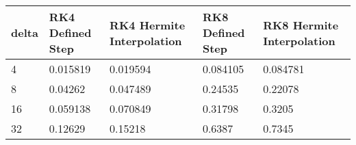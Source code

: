 \begin{tabular}{lllll}
delta & RK4 Defined Step & RK4 Hermite Interpolation & RK8 Defined Step & RK8 Hermite Interpolation \\ 
\hline 
4 & 0.015819 & 0.019594 & 0.084105 & 0.084781 \\ 
8 & 0.04262 & 0.047489 & 0.24535 & 0.22078 \\ 
16 & 0.059138 & 0.070849 & 0.31798 & 0.3205 \\ 
32 & 0.12629 & 0.15218 & 0.6387 & 0.7345 \\ 
\hline 
\end{tabular}